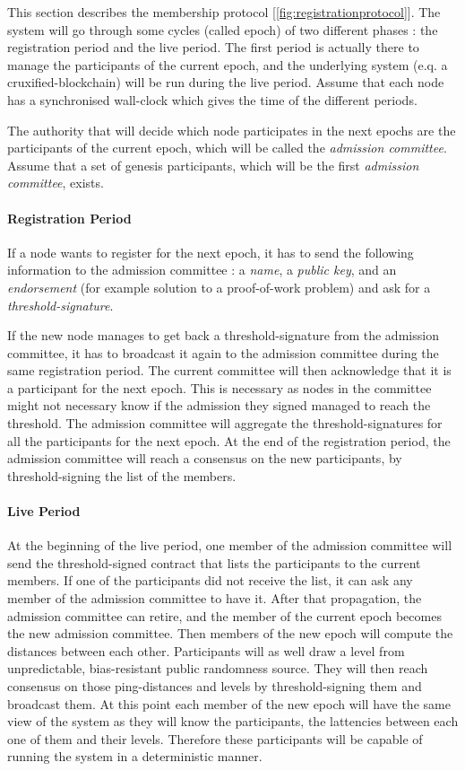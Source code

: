 \documentclass[a4paper,11pt,oneside]{report}
\begin{document}
This section describes the membership protocol [\autoref{fig:registrationprotocol}].
The system will go through some cycles (called epoch) of two different phases :
the registration period and the live period. The first period is actually there
to manage the participants of the current epoch, and the underlying system
(e.q. a cruxified-blockchain) will be run during the live period. Assume
that each node has a synchronised wall-clock which gives the time of the
different periods.

The authority that will decide which node participates in the next epochs are
the participants of the current epoch, which will be called the \textit{admission
committee}. Assume that a set of genesis participants, which will be the first
 \textit{admission committee}, exists.

\paragraph{Registration Period}
If a node wants to register for the next epoch, it has to send the following
information to the admission committee : a  \textit{name}, a \textit{public key}, and an
 \textit{endorsement} (for example solution to a proof-of-work problem) and ask for a
 \textit{threshold-signature}. 

If the new node manages to get back a threshold-signature from the admission
committee, it has to broadcast it again to the admission committee during the
same registration period. The current committee will then acknowledge that it
is a participant for the next epoch. This is necessary as nodes in the committee might not necessary know if the admission they signed managed to reach the threshold. The admission committee will aggregate the
threshold-signatures for all the participants for the next epoch. At the end of
the registration period, the admission committee will reach a consensus on the
new participants, by threshold-signing the list of the members.  

\paragraph{Live Period}
At the beginning of the live period, one member of the admission committee will
send the threshold-signed contract that lists the participants to the current members. If
one of the participants did not receive the list, it can ask any member of the
admission committee to have it. After that propagation, the admission committee
can retire, and the member of the current epoch becomes the new admission
committee. Then members of the new epoch will compute the distances between
each other. Participants will as well draw a level from unpredictable,
bias-resistant public randomness source. They will then reach consensus on
those ping-distances and levels by threshold-signing them and broadcast them.
At this point each member of the new epoch will have the same view of the
system as they will know the participants, the lattencies between each one
of them and their levels. Therefore these participants will be capable of
running the system in a deterministic manner.
\end{document}
